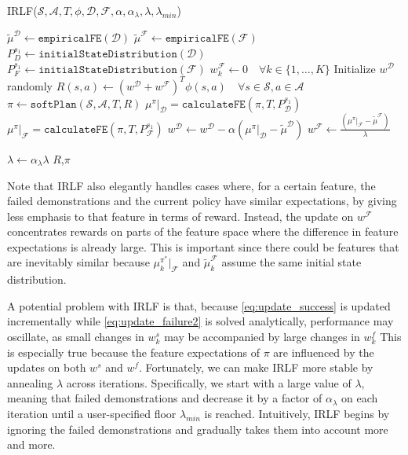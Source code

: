 \documentclass[letterpaper]{article}
\newcommand{\sw}[1]{\textcolor{red}{SW: #1}}
\newcommand{\jm}[1]{\textcolor{blue}{Joao: #1}}
\newcommand{\ks}[1]{\textcolor{green}{Kyriacos: #1}}
\newcommand{\sw}[1]{}
\newcommand{\jm}[1]{}
\newcommand{\ks}[1]{}
\begin{document}
\begin{algorithm}
\caption{IRLF($\mathcal{S},\mathcal{A},T, \phi, \mathcal{D}, \mathcal{F}, \alpha, \alpha_{\lambda}, \lambda, \lambda_{min}$) }
\label{alg:lff}
\begin{algorithmic}[1]
\STATE $\widetilde{\mu}^{\mathcal{D}} \gets \mathtt{empiricalFE}(\mathcal{D})$\hfill {}
\STATE $\widetilde{\mu}^{\mathcal{F}} \gets \mathtt{empiricalFE}(\mathcal{F})$ 
\STATE $P_{D}^{s_1} \gets \mathtt{initialStateDistribution}(\mathcal{D})$
\STATE $P_{F}^{s_1} \gets \mathtt{initialStateDistribution}(\mathcal{F})$
\STATE $w^{\mathcal{F}}_k\gets 0\quad\forall k\in\{1,\ldots,K\}$
\STATE Initialize $w^{\mathcal{D}}$ randomly
\REPEAT
\STATE $R(s,a) \gets (w^{\mathcal{D}}+w^{\mathcal{F}})^T\phi(s,a)\quad\forall s\in\mathcal{S},a\in\mathcal{A}$
\STATE $\pi \gets \mathtt{softPlan}(\mathcal{S},\mathcal{A},T,R)$\hfill{}
\STATE $\mu^\pi|_{\mathcal{D}} = \mathtt{calculateFE}(\pi,T,P_{\mathcal{D}}^{s_1})$
\STATE $\mu^\pi|_{\mathcal{F}} = \mathtt{calculateFE}(\pi,T,P_{\mathcal{F}}^{s_1})$
\STATE $w^{\mathcal{D}} \leftarrow w^{\mathcal{D}} - \alpha (\mu^\pi|_{\mathcal{D}} - \widetilde{\mu}^{\mathcal{D}})$
\STATE $w^{\mathcal{F}} \leftarrow \frac{(\mu^\pi|_{\mathcal{F}} - \widetilde{\mu}^{\mathcal{F}})}{\lambda}$

\STATE $\lambda \leftarrow \alpha_{\lambda}\lambda$
\ENDIF
{}
\RETURN $R$,$\pi$
\end{algorithmic}
\end{algorithm}

Note that IRLF also elegantly handles cases where, for a certain feature, the failed demonstrations and the current policy have similar expectations, by giving less emphasis to that feature in terms of reward. Instead, the update on $w^{\mathcal{F}}$ concentrates rewards on parts of the feature space where the difference in feature expectations is already large. This is important since there could be features that are inevitably similar because $\mu^{\pi^*}_k|_{\mathcal{F}}$ 
and $\widetilde{\mu}^{\mathcal{F}}_k$ assume the same initial state distribution.


A potential problem with IRLF is that, because \eqref{eq:update_success} is updated incrementally while \eqref{eq:update_failure2} is solved analytically, performance may oscillate, as small changes in $w^s_k$ may be accompanied by large changes in $w^f_k$ 
This is especially true because the feature expectations of $\pi$ are influenced by the updates on both $w^s$ and $w^f$. Fortunately, we can make IRLF more stable by annealing $\lambda$ across iterations.  Specifically, we start with a large value of $\lambda$, meaning that failed demonstrations and decrease it by a factor of $\alpha_{\lambda}$ 
on each iteration until a user-specified floor $\lambda_{min}$ 
is reached.  Intuitively, IRLF begins by ignoring the failed demonstrations and gradually takes them into account more and more.
\end{document}
